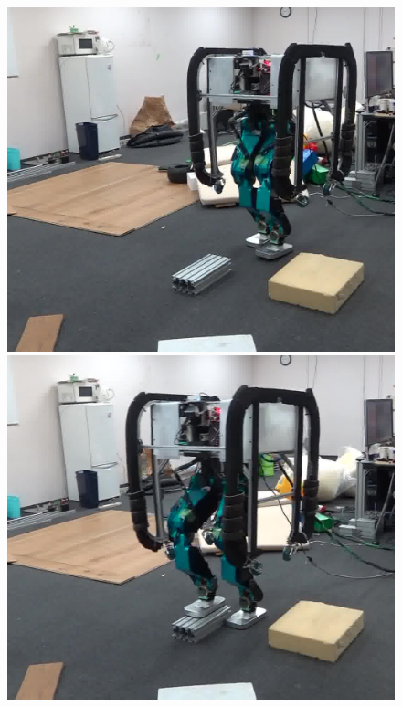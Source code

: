 \documentclass[twocolumn]{preport}
\begin{document}
\begin{figure}[tbh]
  \begin{center}
    \begin{minipage}{0.24\columnwidth}
      \includegraphics[width=0.95\columnwidth]{stephard09}
    \end{minipage}
    \begin{minipage}{0.24\columnwidth}
      \includegraphics[width=0.95\columnwidth]{stephard13}
    \end{minipage}
    \begin{minipage}{0.24\columnwidth}

\end{minipage}
\end{center}
\end{figure}
\end{document}
